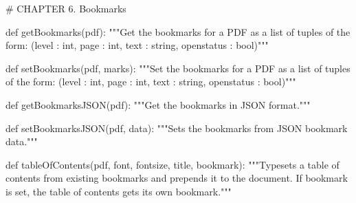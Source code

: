 # CHAPTER 6. Bookmarks

def getBookmarks(pdf):
    """Get the bookmarks for a PDF as a list of tuples of the form:
    (level : int, page : int, text : string, openstatus : bool)"""

def setBookmarks(pdf, marks):
    """Set the bookmarks for a PDF as a list of tuples of the form:
    (level : int, page : int, text : string, openstatus : bool)"""

def getBookmarksJSON(pdf):
    """Get the bookmarks in JSON format."""

def setBookmarksJSON(pdf, data):
    """Sets the bookmarks from JSON bookmark data."""

def tableOfContents(pdf, font, fontsize, title, bookmark):
    """Typesets a table of contents from existing bookmarks and prepends it to
    the document. If bookmark is set, the table of contents gets its own
    bookmark."""
